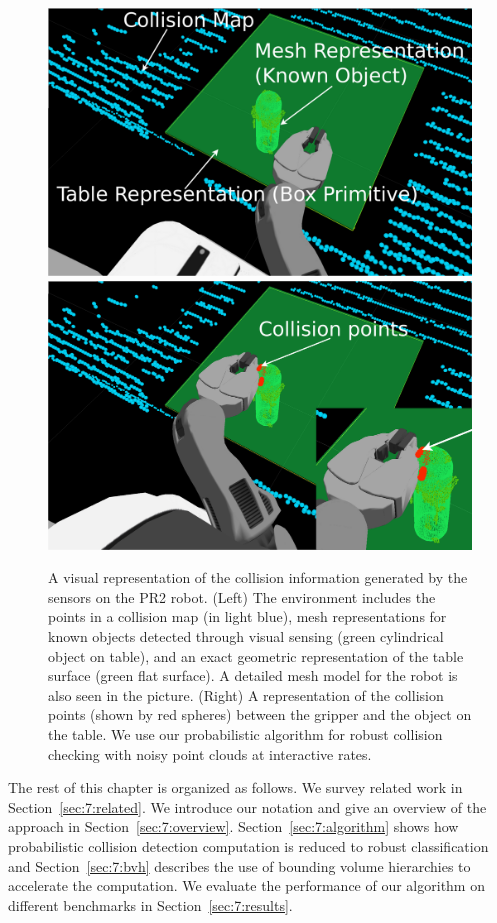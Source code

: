 \begin{figure}[htb]
  \centering
  \includegraphics[width=0.45\linewidth]{figs/7/labeled_small.png}
  \includegraphics[width=0.45\linewidth]{figs/7/labeled_in_collision_pip.png}
  \caption[A visual representation of the collision information generated by the sensors on the PR2 robot]{\label{fig:7:pr2} A visual representation of the collision information generated by the sensors on the PR2 robot. (Left) The environment includes the points in a collision map (in light blue), mesh representations for known objects detected through visual sensing (green cylindrical object on table), and an exact geometric representation of the table surface (green flat surface). A detailed mesh model for the robot is also seen in the picture. (Right) A representation of the collision points (shown by red spheres) between the gripper and the object on the table.
We use our probabilistic algorithm for robust collision checking with noisy point clouds at interactive rates.}
\end{figure}

The rest of this chapter is organized as follows. We survey related work in Section~\ref{sec:7:related}.  We introduce our notation and give an overview of the approach in
Section~\ref{sec:7:overview}.
Section~\ref{sec:7:algorithm} shows how probabilistic collision detection computation is reduced to robust classification and Section~\ref{sec:7:bvh} describes the use of bounding volume hierarchies to accelerate the
computation.
We evaluate the performance of our algorithm on different benchmarks in Section~\ref{sec:7:results}.

